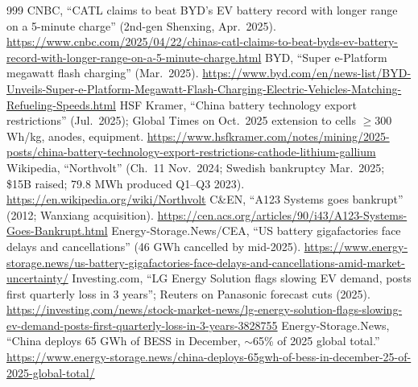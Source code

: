 \begin{thebibliography}{999}
 CNBC, ``CATL claims to beat BYD's EV battery record with longer range on a 5-minute charge'' (2nd-gen Shenxing, Apr.\ 2025). \url{https://www.cnbc.com/2025/04/22/chinas-catl-claims-to-beat-byds-ev-battery-record-with-longer-range-on-a-5-minute-charge.html}
 BYD, ``Super e-Platform megawatt flash charging'' (Mar.\ 2025). \url{https://www.byd.com/en/news-list/BYD-Unveils-Super-e-Platform-Megawatt-Flash-Charging-Electric-Vehicles-Matching-Refueling-Speeds.html}
 HSF Kramer, ``China battery technology export restrictions'' (Jul.\ 2025); Global Times on Oct.\ 2025 extension to cells $\geq$300 Wh/kg, anodes, equipment. \url{https://www.hsfkramer.com/notes/mining/2025-posts/china-battery-technology-export-restrictions-cathode-lithium-gallium}
 Wikipedia, ``Northvolt'' (Ch.\ 11 Nov.\ 2024; Swedish bankruptcy Mar.\ 2025; \$15B raised; 79.8 MWh produced Q1--Q3 2023). \url{https://en.wikipedia.org/wiki/Northvolt}
 C\&EN, ``A123 Systems goes bankrupt'' (2012; Wanxiang acquisition). \url{https://cen.acs.org/articles/90/i43/A123-Systems-Goes-Bankrupt.html}
 Energy-Storage.News/CEA, ``US battery gigafactories face delays and cancellations'' (46 GWh cancelled by mid-2025). \url{https://www.energy-storage.news/us-battery-gigafactories-face-delays-and-cancellations-amid-market-uncertainty/}
 Investing.com, ``LG Energy Solution flags slowing EV demand, posts first quarterly loss in 3 years''; Reuters on Panasonic forecast cuts (2025). \url{https://investing.com/news/stock-market-news/lg-energy-solution-flags-slowing-ev-demand-posts-first-quarterly-loss-in-3-years-3828755}
 Energy-Storage.News, ``China deploys 65 GWh of BESS in December, $\sim$65\% of 2025 global total.'' \url{https://www.energy-storage.news/china-deploys-65gwh-of-bess-in-december-25-of-2025-global-total/}


\end{thebibliography}
